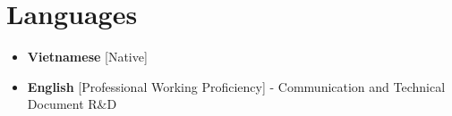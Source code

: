 \documentclass[11pt,a4paper,sans]{moderncv}
\begin{document}
\section{Languages}
    \begin{itemize}[label=\textbullet]
    \item \textbf{Vietnamese} [Native]
	\item {\textbf{English} [Professional Working Proficiency] - Communication and Technical Document R\&D}
    \end{itemize}
\end{document}
